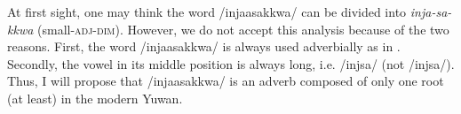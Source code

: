 \z

At first sight, one may think the word /injaasakkwa/ can be divided into \textit{inja-sa-kkwa} (small-\textsc{adj}-\textsc{dim}). However, we do not accept this analysis because of the two reasons. First, the word /injaasakkwa/ is always used adverbially as in . Secondly, the vowel in its middle position is always long, i.e. /injsa/ (not /injsa/). Thus, I will propose that /injaasakkwa/ is an adverb composed of only one root (at least) in the modern Yuwan.
